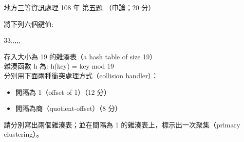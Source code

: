 \begin{pastexam}[label={px:df3-108-ds-05}]{地方三等資訊處理 108 年 第五題}
（申論；20 分）

將下列六個鍵值:
\begin{center}
33,,,,,
\end{center}
存入大小為 19 的雜湊表（a hash table of size 19）\\
雜湊函數 h 為: h(key) = key mod 19\\
分別用下面兩種衝突處理方式（collision handler）：
\begin{itemize}[leftmargin=2.2em, nosep]
\item[㈠] 間隔為 1（offset of 1）（12 分）
\item[㈡] 間隔為商（quotient-offset）（8 分）
\end{itemize}
請分別寫出兩個雜湊表；並在間隔為 1 的雜湊表上，標示出一次聚集（primary clustering）。
\end{pastexam}

